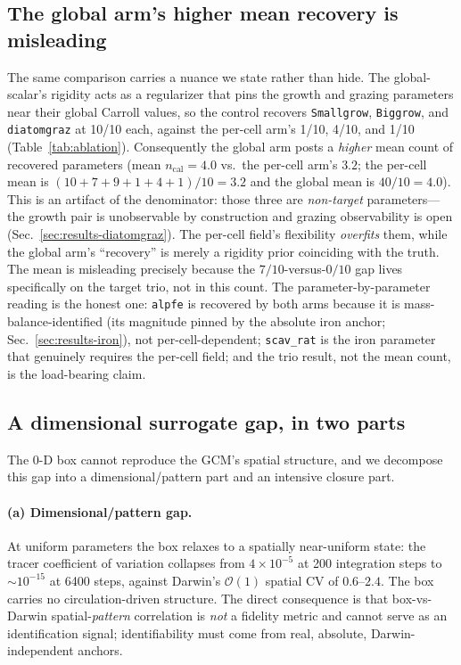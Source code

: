 \documentclass[11pt]{article}
\begin{document}
\subsection{The global arm's higher mean recovery is misleading}
\label{sec:results-nuance}

The same comparison carries a nuance we state rather than hide. The
global-scalar's rigidity acts as a regularizer that pins the growth and grazing
parameters near their global Carroll values, so the control recovers
\texttt{Smallgrow}, \texttt{Biggrow}, and \texttt{diatomgraz} at 10/10 each,
against the per-cell arm's 1/10, 4/10, and 1/10 (Table~\ref{tab:ablation}).
Consequently the global arm posts a \emph{higher} mean count of recovered
parameters (mean $n_{\mathrm{cal}} = 4.0$ vs.\ the per-cell arm's $3.2$; the
per-cell mean is $(10+7+9+1+4+1)/10 = 3.2$ and the global mean is $40/10 = 4.0$).
This is an artifact of the denominator: those three
are \emph{non-target} parameters---the growth pair is unobservable by
construction and grazing observability is open (Sec.~\ref{sec:results-diatomgraz}).
The per-cell field's flexibility \emph{overfits} them, while the global arm's
``recovery'' is merely a rigidity prior coinciding with the truth. The mean is
misleading precisely because the $7/10$-versus-$0/10$ gap lives specifically on
the target trio, not in this count. The
parameter-by-parameter reading is the honest one: \texttt{alpfe} is recovered by
both arms because it is mass-balance-identified (its magnitude pinned by the
absolute iron anchor; Sec.~\ref{sec:results-iron}),
not per-cell-dependent; \texttt{scav\_rat} is the iron parameter that genuinely
requires the per-cell field; and the trio result, not the mean count, is the
load-bearing claim.

\subsection{A dimensional surrogate gap, in two parts}
\label{sec:results-gap}

The 0-D box cannot reproduce the GCM's spatial structure, and we decompose this
gap into a dimensional/pattern part and an intensive closure part.

\paragraph{(a) Dimensional/pattern gap.}
At uniform parameters the box relaxes to a spatially near-uniform state: the
tracer coefficient of variation collapses from $4\times10^{-5}$ at 200 integration
steps to ${\sim}10^{-15}$ at 6400 steps, against Darwin's $\mathcal{O}(1)$
spatial CV of $0.6\text{--}2.4$. The box carries no circulation-driven structure.
The direct consequence is that box-vs-Darwin spatial-\emph{pattern} correlation is
\emph{not} a fidelity metric and cannot serve as an identification signal;
identifiability must come from real, absolute, Darwin-independent anchors.
\end{document}
